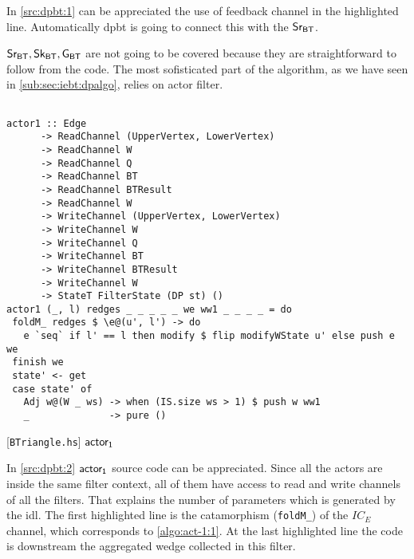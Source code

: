 In \autoref{src:dpbt:1} can be appreciated the use of feedback channel in the highlighted line. 
Automatically \acrshort{dpbt} is going to connect this with the $\mathsf{Sr_{BT}}$.

$\mathsf{Sr_{BT}}, \mathsf{Sk_{BT}}, \mathsf{G_{BT}}$ are not going to be covered because they are straightforward to follow from the code. 
The most sofisticated part of the algorithm, as we have seen in \autoref{sub:sec:iebt:dpalgo}, relies on actor filter.

\begin{listing}[htp!]
\begin{verbatim}

actor1 :: Edge
      -> ReadChannel (UpperVertex, LowerVertex)
      -> ReadChannel W
      -> ReadChannel Q
      -> ReadChannel BT
      -> ReadChannel BTResult
      -> ReadChannel W
      -> WriteChannel (UpperVertex, LowerVertex)
      -> WriteChannel W
      -> WriteChannel Q
      -> WriteChannel BT
      -> WriteChannel BTResult
      -> WriteChannel W
      -> StateT FilterState (DP st) ()
actor1 (_, l) redges _ _ _ _ _ we ww1 _ _ _ _ = do
 foldM_ redges $ \e@(u', l') -> do
   e `seq` if l' == l then modify $ flip modifyWState u' else push e we
 finish we
 state' <- get
 case state' of
   Adj w@(W _ ws) -> when (IS.size ws > 1) $ push w ww1
   _              -> pure ()

\end{verbatim}
\caption{[\texttt{BTriangle.hs}] $\aaa$}
\label{src:dpbt:2}
\end{listing}

In \autoref{src:dpbt:2} $\mathsf{actor_1}$ source code can be appreciated. Since all the actors are inside the same filter context, all of them have access to read and write
channels of all the filters. That explains the number of parameters which is generated by the \acrshort{idl}.
The first highlighted line is the catamorphism (\texttt{foldM_}) of the $IC_E$ channel, which corresponds to \autoref{algo:act-1:1}.
At the last highlighted line the code is downstream the aggregated wedge collected in this filter.

